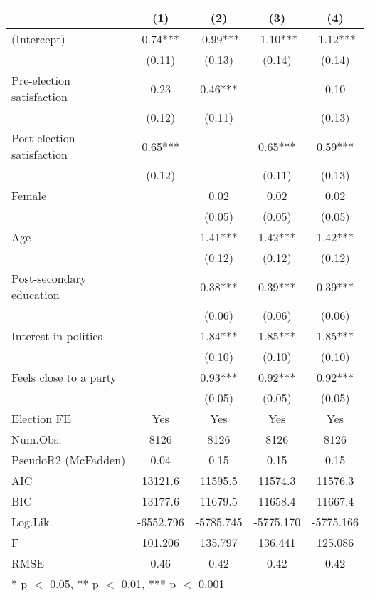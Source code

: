 \begin{table}
\centering
\begin{tabular}[t]{lcccc}
\toprule
  & (1) & (2) & (3) & (4)\\
\midrule
(Intercept) & 0.74*** & -0.99*** & -1.10*** & -1.12***\\
 & (0.11) & (0.13) & (0.14) & (0.14)\\
Pre-election satisfaction & 0.23 & 0.46*** &  & 0.10\\
 & (0.12) & (0.11) &  & (0.13)\\
Post-election satisfaction & 0.65*** &  & 0.65*** & 0.59***\\
 & (0.12) &  & (0.11) & (0.13)\\
Female &  & 0.02 & 0.02 & 0.02\\
 &  & (0.05) & (0.05) & \vphantom{1} (0.05)\\
Age &  & 1.41*** & 1.42*** & 1.42***\\
 &  & (0.12) & (0.12) & (0.12)\\
Post-secondary education &  & 0.38*** & 0.39*** & 0.39***\\
 &  & (0.06) & (0.06) & (0.06)\\
Interest in politics &  & 1.84*** & 1.85*** & 1.85***\\
 &  & (0.10) & (0.10) & (0.10)\\
Feels close to a party &  & 0.93*** & 0.92*** & 0.92***\\
 &  & (0.05) & (0.05) & (0.05)\\
\midrule
Election FE & Yes & Yes & Yes & Yes\\
Num.Obs. & 8126 & 8126 & 8126 & 8126\\
PseudoR2 (McFadden) & 0.04 & 0.15 & 0.15 & 0.15\\
AIC & 13121.6 & 11595.5 & 11574.3 & 11576.3\\
BIC & 13177.6 & 11679.5 & 11658.4 & 11667.4\\
Log.Lik. & -6552.796 & -5785.745 & -5775.170 & -5775.166\\
F & 101.206 & 135.797 & 136.441 & 125.086\\
RMSE & 0.46 & 0.42 & 0.42 & 0.42\\
\bottomrule
\multicolumn{5}{l}{\rule{0pt}{1em}* p $<$ 0.05, ** p $<$ 0.01, *** p $<$ 0.001}\\
\end{tabular}
\end{table}
